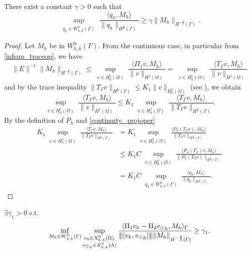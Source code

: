 \begin{lemma}\label{lemma:trspace_infsup} 
There exist a constant $\gamma >0$ such that
\begin{equation*}
\sup_{\substack{q_h \in W_{h,k}^0(\Gamma)}} \frac{\langle q_h , M_h \rangle}{ \|q_h\|_{H^{\frac 12}(\Gamma)}} \geq \gamma \|M_h\|_{H^{-\frac 12}(\Gamma)}.
\end{equation*} 
\end{lemma}
\begin{proof}
Let $M_h$ be in $W_{h,k}^0(\Gamma)$. From the continuous case, in particular from \eqref{infsup_traceop}, we have
\begin{equation*}
\|E\|^{-1} \|M_h\|_{H^{-\frac 12}(\Gamma)} \leq \sup_{\substack{v \in H^1_0(\Omega)}} \frac{\langle \Pi_1 v , M_h \rangle}{\|v\|_{H^1(\Omega)}} =\sup_{\substack{v \in H^1_0(\Omega)}} \frac{\langle T_{\Gamma} v , M_h \rangle}{\|v\|_{H^1(\Omega)}}
\end{equation*}
and by the trace inequality $\|T_{\Gamma}v\|_{H^\frac 12 (\Gamma)} \leq K_1 \|v\|_{H^1_0(\Omega)}$ (see \cite[7.56]{adams1975pure}), we obtain 
\begin{equation*}
\sup_{\substack{v \in H^1_0(\Omega)}} \frac{\langle T_{\Gamma} v , M_h \rangle}{\|v\|_{H^1(\Omega)}}
\leq K_1 \sup_{\substack{v \in H^1_0(\Omega)}} \frac{\langle T_{\Gamma} v , M_h \rangle}{ \|T_{\Gamma}v\|_{H^{\frac 12}(\Gamma)}}.
\end{equation*}
By the definition of $P_h$ and \eqref{continuity_projoper} 
\begin{equation*}
\begin{split}
K_1 \sup_{\substack{v \in H^1_0(\Omega)}} \frac{\langle T_{\Gamma} v , M_h \rangle}{ \|T_{\Gamma}v\|_{H^{\frac 12}(\Gamma)}}&= K_1 \sup_{\substack{v \in H^1_0(\Omega)}} \frac{\langle P_h(T_{\Gamma} v) , M_h \rangle}{ \|T_{\Gamma}v\|_{H^{\frac 12}(\Gamma)}}\\
&\leq  K_1 C \sup_{\substack{v \in H^1_0(\Omega)}} \frac{\langle P_h(T_{\Gamma}) v , M_h \rangle}{ \|P_h(T_{\Gamma}v)\|_{H^{\frac 12}(\Gamma)}}\\
&= K_1 C \sup_{\substack{q_h \in W_{h,k}^0(\Gamma)}} \frac{\langle q_h , M_h \rangle}{  \|q_h\|_{H^{\frac 12}(\Gamma)}}.
\end{split}
\end{equation*}
\end{proof}

\begin{theorem} 
$\exists \gamma _1 >0$ s.t.
\begin{equation}\label{inf_sup_discrete_prob1}
\inf_{M_h \in W^0_{h,k}(\Gamma)} 
\sup_{\substack{v_h \in X^0_{h,k}(\Omega),\\ {\vd}_h \in X^0_{h,k}(\Lambda)}} \frac{ \langle \Pi_1 v_h - \Pi_2 {\vd}_h, M_h \rangle _{\Gamma}} {\vertiii{[v_h, {\vd} _h]} \|M_h\|_{H^{-\frac 12 }(\Gamma)}} 
\geq \gamma _1. 
\end{equation}
\end{theorem}

